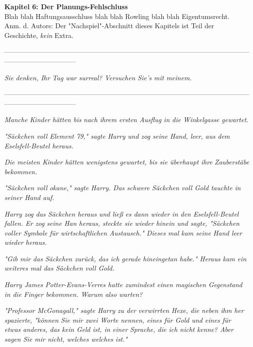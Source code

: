 

\hypertarget{der-planungs-fehlschluss}{%

\textbf{Kapitel 6: Der Planungs-Fehlschluss}\\

Blah blah Haftungsausschluss blah blah Rowling blah blah Eigentumsrecht.\\ Anm. d. Autors: Der "Nachspiel"-Abschnitt dieses Kapitels ist Teil der Geschichte, \emph{kein} Extra.

--------------------------------------------------------------------------------------------------------------------------------------------

\emph{\emph{Sie denken, Ihr Tag war surreal? Versuchen Sie's mit meinem.}}

--------------------------------------------------------------------------------------------------------------------------------------------

\emph{\emph{Manche}} \emph{Kinder hätten bis} \emph{\emph{nach}} \emph{ihrem ersten Ausflug in die Winkelgasse gewartet.}

\emph{"Säckchen voll Element 79," sagte Harry und zog seine Hand, leer, aus dem Eselsfell-Beutel heraus.}

\emph{Die meisten Kinder hätten wenigstens gewartet, bis sie überhaupt ihre} \emph{\emph{Zauberstäbe}} \emph{bekommen.}

\emph{"Säckchen voll} \emph{\emph{okane,}" sagte Harry. Das schwere Säckchen voll Gold tauchte in seiner Hand auf.}

\emph{Harry zog das Säckchen heraus und ließ es dann wieder in den Eselsfell-Beutel fallen. Er zog seine Han heraus, steckte sie wieder hinein und sagte, "Säckchen voller Symbole für wirtschaftlichen Austausch." Dieses mal kam seine Hand leer wieder heraus.}

\emph{"Gib mir das Säckchen zurück, das ich gerade hineingetan habe." Heraus kam ein weiteres mal das Säckchen voll Gold.}

\emph{Harry James Potter-Evans-Verres hatte zumindest einen magischen Gegenstand in die Finger bekommen. Warum also warten?}

\emph{"Professor McGonagall," sagte Harry zu der verwirrten Hexe, die neben ihm her spazierte, "können Sie mir zwei Worte nennen, eines für Gold und eines für etwas anderes, das kein Geld ist, in einer Sprache, die ich nicht kenne? Aber sagen Sie mir nicht, welches welches ist."}

}
